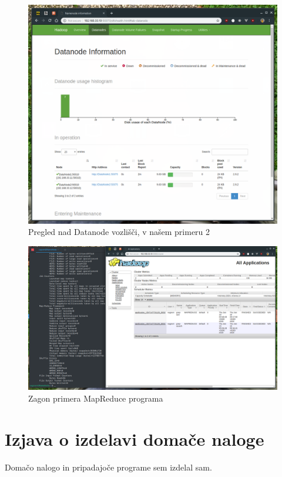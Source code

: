 \documentclass[a4paper,11pt]{article}
\begin{document}
\begin{figure}
\begin{center}
\includegraphics[scale=0.5]{./namenode-datanodes.png}
\caption{Pregled nad Datanode vozlišči, v našem primeru 2}
\label{nnd}
\end{center}
\end{figure}

\begin{figure}
\begin{center}
\includegraphics[scale=0.35]{./mapreduce-example.png}
\caption{Zagon primera MapReduce programa}
\label{mre}
\end{center}
\end{figure}


\section{Izjava o izdelavi domače naloge}
Domačo nalogo in pripadajoče programe sem izdelal sam.
\end{document}
